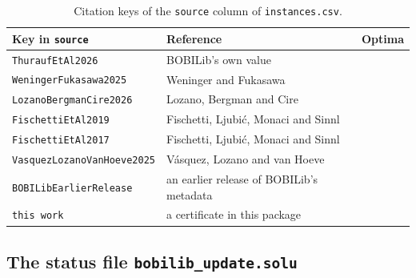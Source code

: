 \begin{table}[ht]
\centering
\small
\caption{Citation keys of the \texttt{source} column of \texttt{instances.csv}.}\label{tab:source-keys}
\begin{tabular}{@{}lll@{}}
\toprule
Key in \texttt{source} & Reference & Optima\\
\midrule
\texttt{ThuraufEtAl2026} & BOBILib's own value\cite{thurauf2026bobilib} & \\
\texttt{WeningerFukasawa2025} & Weninger and Fukasawa\cite{weninger2025fast} & \NumLitKip{}\\
\texttt{LozanoBergmanCire2026} & Lozano, Bergman and Cire\cite{lozano2026network} & \NumLitLozano{}\\
\texttt{FischettiEtAl2019} & Fischetti, Ljubi\'c, Monaci and Sinnl\cite{fischetti2019interdiction} & \NumLitImkp{}\\
\texttt{FischettiEtAl2017} & Fischetti, Ljubi\'c, Monaci and Sinnl\cite{fischetti2017new} & \NumLitFischettiSeventeen{}\\
\texttt{VasquezLozanoVanHoeve2025} & V\'asquez, Lozano and van Hoeve\cite{vasquez2025single} & \NumLitVasquez{}\\
\texttt{BOBILibEarlierRelease} & an earlier release of BOBILib's metadata\cite{bobilib_website} & \NumLitEarlierRelease{}\\
\texttt{this work} & a certificate in this package & \NumNewOptimal{}\\
\bottomrule
\end{tabular}
\end{table}

\subsection{The status file \texttt{bobilib\_update.solu}}\label{app:data-solu}

